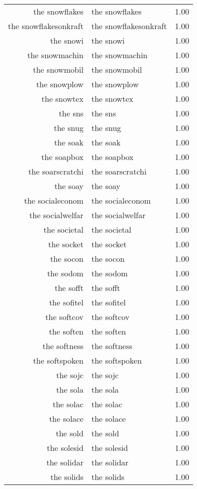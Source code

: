 \begin{table}[ht]
\begin{tabular}{rlr}
  the snowflakes & the snowflakes & 1.00 \\ 
  the snowflakesonkraft & the snowflakesonkraft & 1.00 \\ 
  the snowi & the snowi & 1.00 \\ 
  the snowmachin & the snowmachin & 1.00 \\ 
  the snowmobil & the snowmobil & 1.00 \\ 
  the snowplow & the snowplow & 1.00 \\ 
  the snowtex & the snowtex & 1.00 \\ 
  the sns & the sns & 1.00 \\ 
  the snug & the snug & 1.00 \\ 
  the soak & the soak & 1.00 \\ 
  the soapbox & the soapbox & 1.00 \\ 
  the soarscratchi & the soarscratchi & 1.00 \\ 
  the soay & the soay & 1.00 \\ 
  the socialeconom & the socialeconom & 1.00 \\ 
  the socialwelfar & the socialwelfar & 1.00 \\ 
  the societal & the societal & 1.00 \\ 
  the socket & the socket & 1.00 \\ 
  the socon & the socon & 1.00 \\ 
  the sodom & the sodom & 1.00 \\ 
  the sofft & the sofft & 1.00 \\ 
  the sofitel & the sofitel & 1.00 \\ 
  the softcov & the softcov & 1.00 \\ 
  the soften & the soften & 1.00 \\ 
  the softness & the softness & 1.00 \\ 
  the softspoken & the softspoken & 1.00 \\ 
  the sojc & the sojc & 1.00 \\ 
  the sola & the sola & 1.00 \\ 
  the solac & the solac & 1.00 \\ 
  the solace & the solace & 1.00 \\ 
  the sold & the sold & 1.00 \\ 
  the solesid & the solesid & 1.00 \\ 
  the solidar & the solidar & 1.00 \\ 
  the solids & the solids & 1.00 \\ 

\end{tabular}
\end{table}
